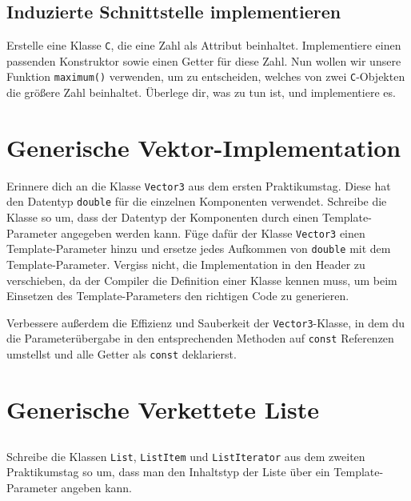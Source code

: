 \subsection{Induzierte Schnittstelle implementieren}
Erstelle eine Klasse \texttt{C}, die eine Zahl als Attribut beinhaltet. Implementiere einen passenden Konstruktor sowie einen Getter für diese Zahl. Nun wollen wir unsere Funktion  \texttt{maximum()} verwenden, um zu entscheiden, welches von zwei \texttt{C}-Objekten die größere Zahl beinhaltet.
Überlege dir, was zu tun ist, und implementiere es.




\newpage

\section{Generische Vektor-Implementation}
Erinnere dich an die Klasse \texttt{Vector3} aus dem ersten Praktikumstag. Diese hat den Datentyp \texttt{double} für die einzelnen Komponenten verwendet. Schreibe die Klasse so um, dass der Datentyp der Komponenten durch einen Template-Parameter angegeben werden kann.
Füge dafür der Klasse \texttt{Vector3} einen Template-Parameter hinzu und ersetze jedes Aufkommen von \texttt{double} mit dem Template-Parameter.
Vergiss nicht, die Implementation in den Header zu verschieben, da der Compiler die Definition einer Klasse kennen muss, um beim Einsetzen des Template-Parameters den richtigen Code zu generieren.

Verbessere außerdem die Effizienz und Sauberkeit der \texttt{Vector3}-Klasse, in dem du die Parameterübergabe in den entsprechenden Methoden auf \texttt{const} Referenzen umstellst und alle Getter als \texttt{const} deklarierst.



\newpage

\section{Generische Verkettete Liste}
\label{sec:list}
\subsection{}
Schreibe die Klassen \texttt{List}, \texttt{ListItem} und \texttt{ListIterator} aus dem zweiten Praktikumstag so um, dass man den Inhaltstyp der Liste über ein Template-Parameter angeben kann.

